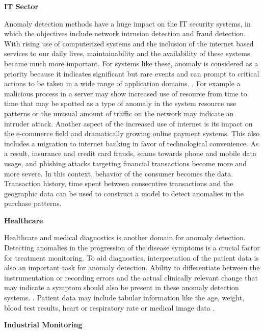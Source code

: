 \textbf{ IT Sector}

Anomaly detection methods have a huge impact on the IT security systems, in which the objectives
include network intrusion detection and fraud detection. \cite{Pimentel:2014:RRN:2588908.2589196}
With rising use of computerized systems and the inclusion of the internet based services to
our daily lives, maintainability and the availability of these systems became much more important.
For systems like these, anomaly is considered as a priority because it indicates significant but
rare events and can prompt to critical actions to be taken in a wide range of application domains.
\cite{AHMED201619}. For example a malicious process in a server may show increased use of resource
from time to time that may be spotted as a type of anomaly in the system resource use patterns or
the unusual amount of traffic on the network may indicate an intruder attack. \cite{FERNANDES20161}
\cite{JABEZ2015338} Another aspect of the increased use of internet is its impact on the e-commerce
field and dramatically growing online payment systems. This also includes a migration to internet
banking in favor of technological convenience. As a result, insurance and credit card frauds,
scams towards phone and mobile data usage, and phishing attacks targeting financial transactions
become more and more severe. \cite{finance_anomaly} In this context, behavior of the consumer
becomes the data. Transaction history, time spent between consecutive transactions and the
geographic data can be used to construct a model to detect anomalies in the purchase patterns.

\textbf{ Healthcare}

Healthcare and medical diagnostics is another domain for anomaly detection. Detecting anomalies in
the progression of the disease symptoms is a crucial factor for treatment monitoring.
\cite{Schlegl2017UnsupervisedAD} To aid diagnostics, interpretation of the patient data is also an
important task for anomaly detection. Ability to differentiate between the instrumentation or
recording errors and the actual clinically relevant change that may indicate a symptom should also
be present in these anomaly detection systems. \cite{Pimentel:2014:RRN:2588908.2589196}. Patient
data may include tabular information like the age, weight, blood test results, heart or
respiratory rate \cite{inproceedings_medical}\cite{Markou:2003:NDR:959414.959416} or medical image data
\cite{Schlegl2017UnsupervisedAD}. 

\textbf{ Industrial Monitoring}

